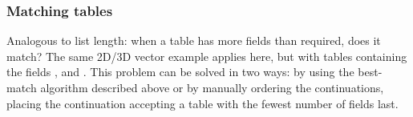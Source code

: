 \subsubsection{Matching tables}
Analogous to list length: when a table has more fields than required, does it match? The same 2D/3D vector example applies here, but with tables containing the fields ,  and .
This problem can be solved in two ways: by using the best-match algorithm described above or by manually ordering the continuations, placing the continuation accepting a table with the fewest number of fields last.
